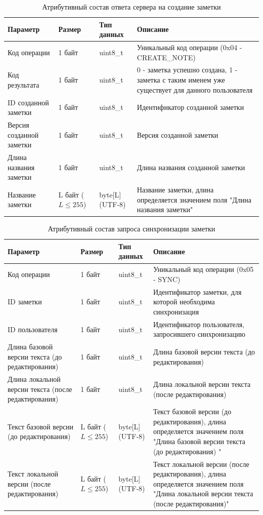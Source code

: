 \begin{table}[H]
    \centering
    \caption{Атрибутивный состав ответа сервера на создание заметки}
    \renewcommand{\arraystretch}{1.2}
    \begin{tabular}{|p{4cm}|p{2cm}|p{3cm}|p{6cm}|}
    \hline
    \textbf{Параметр} & \textbf{Размер} & \textbf{Тип данных} & \textbf{Описание} \\ \hline
    Код операции & 1 байт & uint8\_t & Уникальный код операции (0x04 - CREATE\_NOTE) \\ \hline
    Код результата & 1 байт & uint8\_t & 0 - заметка успешно создана, 1 - заметка с таким именем уже существует для данного пользователя  \\ \hline
    ID созданной заметки & 1 байт & uint8\_t & Идентификатор созданной заметки \\ \hline
    Версия созданной заметки & 1 байт & uint8\_t & Версия созданной заметки \\ \hline
    Длина названия заметки & 1 байт & uint8\_t & Длина названия созданной заметки \\ \hline
    Название заметки & L байт (\(L \le 255\)) & byte[L] (UTF-8) & Название заметки, длина определяется значением поля "Длина названия заметки" \\ \hline
    \end{tabular}
    \label{tab:note_create_response_min}
\end{table}


\begin{table}[H]
    \centering
    \caption{Атрибутивный состав запроса синхронизации заметки}
    \begin{tabular}{|p{4cm}|p{2cm}|p{3cm}|p{6cm}|}
    \hline
    \textbf{Параметр} & \textbf{Размер} & \textbf{Тип данных} & \textbf{Описание} \\ \hline
    Код операции & 1 байт & uint8\_t & Уникальный код операции (0x05 - SYNC) \\ \hline
    ID заметки & 1 байт & uint8\_t & Идентификатор заметки, для которой необходима синхронизация \\ \hline
    ID пользователя & 1 байт & uint8\_t & Идентификатор пользователя, запросившего синхронизацию \\ \hline
    Длина базовой версии текста (до редактирования) & 1 байт & uint8\_t & Длина базовой версии текста (до редактирования) \\ \hline
    Длина локальной версии текста (после редактирования) & 1 байт & uint8\_t & Длина локальной версии текста (после редактирования) \\ \hline
    Текст базовой версии (до редактирования) & L байт (\(L \le 255\)) & byte[L] (UTF-8) & Текст базовой версии (до редактирования), длина определяется значением поля "Длина базовой версии текста (до редактирования) " \\ \hline
    Текст локальной версии (после редактирования) & L байт (\(L \le 255\)) & byte[L] (UTF-8) & Текст локальной версии (после редактирования), длина определяется значением поля "Длина локальной версии текста (после редактирования)" \\ \hline
    \end{tabular}
    \label{tab:note_create_request}
\end{table}


